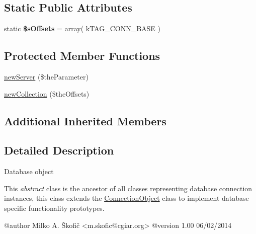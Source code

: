 \subsection*{Static Public Attributes}
\begin{DoxyCompactItemize}
\item 
\hypertarget{class_ontology_wrapper_1_1_database_object_a28b9a48fa04bbf9c64e584b99ada9704}{static {\bfseries \$s\-Offsets} = array( k\-T\-A\-G\-\_\-\-C\-O\-N\-N\-\_\-\-B\-A\-S\-E )}\label{class_ontology_wrapper_1_1_database_object_a28b9a48fa04bbf9c64e584b99ada9704}

\end{DoxyCompactItemize}
\subsection*{Protected Member Functions}
\begin{DoxyCompactItemize}
\item 
\hyperlink{class_ontology_wrapper_1_1_database_object_aa145306a1c58b9469d04dd17daa7fdbb}{new\-Server} (\$the\-Parameter)
\item 
\hyperlink{class_ontology_wrapper_1_1_database_object_aa72c5ba47e852c983f746aa95ec06c1d}{new\-Collection} (\$the\-Offsets)
\end{DoxyCompactItemize}
\subsection*{Additional Inherited Members}


\subsection{Detailed Description}
Database object

This {\itshape abstract} class is the ancestor of all classes representing database connection instances, this class extends the \hyperlink{class_ontology_wrapper_1_1_connection_object}{Connection\-Object} class to implement database specific functionality prototypes. \begin{DoxyVerb} @author            Milko A. Škofič <m.skofic@cgiar.org>
 @version   1.00 06/02/2014\end{DoxyVerb}
 

